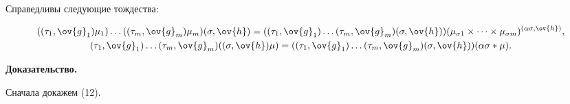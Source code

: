 \begin{lem}


Справедливы следующие тождества\/${:}$


\begin{gather}


((\t_1,\ov{g}_1)\mu_1) \dotsc ((\t_m,\ov{g}_m)\mu_m) (\s,\ov{h})=


((\t_1,\ov{g}_1) \dotsc (\t_m,\ov{g}_m) (\s,\ov{h}))


(\mu_{\s1} \times \dotsb \times \mu_{\s{m}})^{(\al\s,\ov{h})},\\


%


(\t_1,\ov{g}_1) \dotsc (\t_m,\ov{g}_m)((\s,\ov{h})\mu)=


((\t_1,\ov{g}_1) \dotsc (\t_m,\ov{g}_m) (\s,\ov{h}))


(\al\s * \mu).


\end{gather}


\end{lem}





{\bf Доказательство.}


Сначала докажем (12).


